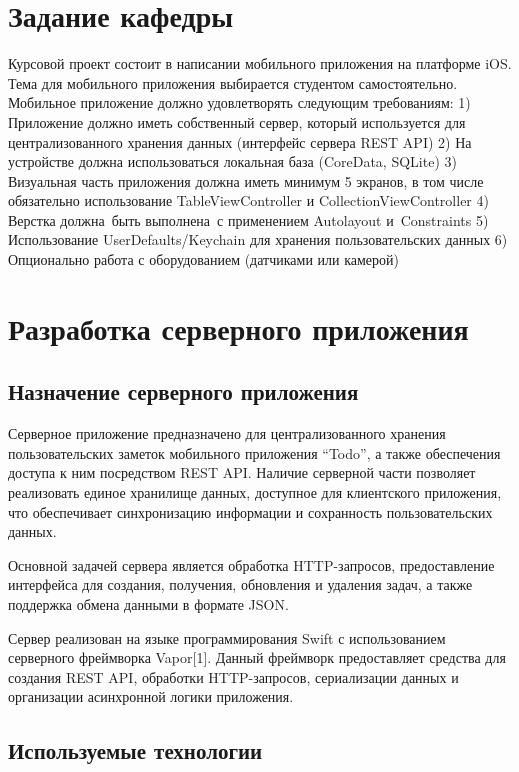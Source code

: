\documentclass[14pt,a4paper]{extarticle}
\begin{document}
\newpage
\tableofcontents

\newpage
\section{Задание кафедры}

Курсовой проект состоит в написании мобильного приложения на платформе iOS.
Тема для мобильного приложения выбирается студентом самостоятельно. Мобильное приложение должно удовлетворять следующим требованиям:
    1) Приложение должно иметь собственный сервер, который используется для централизованного хранения данных (интерфейс сервера REST API)
    2) На устройстве должна использоваться локальная база (CoreData, SQLite)
    3) Визуальная часть приложения должна иметь минимум 5 экранов, в том числе обязательно использование TableViewController и CollectionViewController
    4) Верстка должна быть выполнена с применением Autolayout и Constraints
    5) Использование UserDefaults/Keychain для хранения пользовательских данных
    6) Опционально работа с оборудованием (датчиками или камерой)

\newpage
\section{Разработка серверного приложения}

\subsection{Назначение серверного приложения}

Серверное приложение предназначено для централизованного хранения пользовательских заметок мобильного приложения ``Todo'', а также обеспечения доступа к ним посредством REST API. Наличие серверной части позволяет реализовать единое хранилище данных, доступное для клиентского приложения, что обеспечивает синхронизацию информации и сохранность пользовательских данных.

Основной задачей сервера является обработка HTTP-запросов, предоставление интерфейса для создания, получения, обновления и удаления задач, а также поддержка обмена данными в формате JSON.

Сервер реализован на языке программирования Swift с использованием серверного фреймворка Vapor[1]. Данный фреймворк предоставляет средства для создания REST API, обработки HTTP-запросов, сериализации данных и организации асинхронной логики приложения.

\subsection{Используемые технологии}
\end{document}
